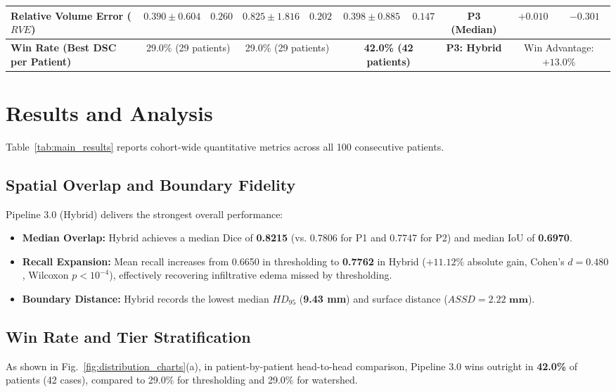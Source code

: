 \documentclass[10pt,conference]{IEEEtran}
\begin{document}
\begin{table}[!t]
{\begin{tabular}{lccccccccc}
\textbf{Relative Volume Error ($RVE$)} & $\mathbf{0.390 \pm 0.604}$ & $0.260$ & $0.825 \pm 1.816$ & $0.202$ & $0.398 \pm 0.885$ & $\mathbf{0.147}$ & \textbf{P3 (Median)} & $+0.010$ & $-0.301$ \\
\midrule
\textbf{Win Rate (Best DSC per Patient)} & \multicolumn{2}{c}{29.0\% (29 patients)} & \multicolumn{2}{c}{29.0\% (29 patients)} & \multicolumn{2}{c}{\textbf{42.0\% (42 patients)}} & \textbf{P3: Hybrid} & \multicolumn{2}{c}{Win Advantage: $+13.0\%$} \\
\bottomrule
\end{tabular}
}
\end{table}

\section{Results and Analysis}
Table~\ref{tab:main_results} reports cohort-wide quantitative metrics across all 100 consecutive patients.

\subsection{Spatial Overlap and Boundary Fidelity}
Pipeline 3.0 (Hybrid) delivers the strongest overall performance:
\begin{itemize}
    \item \textbf{Median Overlap:} Hybrid achieves a median Dice of \textbf{0.8215} (vs. 0.7806 for P1 and 0.7747 for P2) and median IoU of \textbf{0.6970}.
    \item \textbf{Recall Expansion:} Mean recall increases from 0.6650 in thresholding to \textbf{0.7762} in Hybrid ($+11.12\%$ absolute gain, Cohen's $d = 0.480$, Wilcoxon $p < 10^{-4}$), effectively recovering infiltrative edema missed by thresholding.
    \item \textbf{Boundary Distance:} Hybrid records the lowest median $HD_{95}$ (\textbf{9.43 mm}) and surface distance ($ASSD = \mathbf{2.22\text{ mm}}$).
\end{itemize}

\subsection{Win Rate and Tier Stratification}
As shown in Fig.~\ref{fig:distribution_charts}(a), in patient-by-patient head-to-head comparison, Pipeline 3.0 wins outright in \textbf{42.0\%} of patients (42 cases), compared to 29.0\% for thresholding and 29.0\% for watershed.
\end{document}
